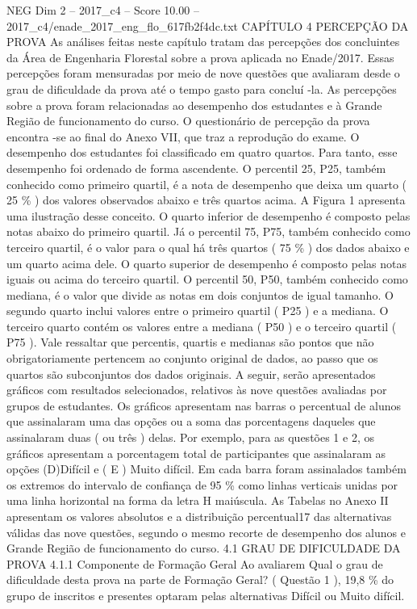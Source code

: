 \begin{textsample}{NEG Dim 2 – 2017\_c4 – Score 10.00 – 2017\_c4/enade\_2017\_eng\_flo\_617fb2f4dc.txt}  \label{ex:f2_neg_340}
CAPÍTULO 4 PERCEPÇÃO DA PROVA As análises feitas neste capítulo tratam das percepções dos concluintes da Área de Engenharia Florestal sobre a prova aplicada no Enade/2017.
Essas percepções foram mensuradas por meio de nove questões que avaliaram desde o grau de dificuldade da prova até o tempo gasto para concluí -la.
As percepções sobre a prova foram relacionadas ao desempenho dos estudantes e à Grande Região de funcionamento do curso.
O questionário de percepção da prova encontra -se ao final do Anexo VII, que traz a reprodução do exame.
O desempenho dos estudantes foi classificado em quatro quartos.
Para tanto, esse desempenho foi ordenado de forma ascendente.
O percentil 25, P25, também conhecido como primeiro quartil, é a nota de desempenho que deixa um quarto ( 25 \% ) dos valores observados abaixo e três quartos acima.
A Figura 1 apresenta uma ilustração desse conceito.
O quarto inferior de desempenho é composto pelas notas abaixo do primeiro quartil.
Já o percentil 75, P75, também conhecido como terceiro quartil, é o valor para o qual há três quartos ( 75 \% ) dos dados abaixo e um quarto acima dele.
O quarto superior de desempenho é composto pelas notas iguais ou acima do terceiro quartil.
O percentil 50, P50, também conhecido como mediana, é o valor que divide as notas em dois conjuntos de igual tamanho.
O segundo quarto inclui valores entre o primeiro quartil ( P25 ) e a mediana.
O terceiro quarto contém os valores entre a mediana ( P50 ) e o terceiro quartil ( P75 ).
Vale ressaltar que percentis, quartis e medianas são pontos que não obrigatoriamente pertencem ao conjunto original de dados, ao passo que os quartos são subconjuntos dos dados originais.
A seguir, serão apresentados gráficos com resultados selecionados, relativos às nove questões avaliadas por grupos de estudantes.
Os gráficos apresentam nas barras o percentual de alunos que assinalaram uma das opções ou a soma das porcentagens daqueles que assinalaram duas ( ou três ) delas.
Por exemplo, para as questões 1 e 2, os gráficos apresentam a porcentagem total de participantes que assinalaram as opções (D)Difícil e ( E ) Muito difícil.
Em cada barra foram assinalados também os extremos do intervalo de confiança de 95 \% como linhas verticais unidas por uma linha horizontal na forma da letra H maiúscula.
As Tabelas no Anexo II apresentam os valores absolutos e a distribuição percentual17 das alternativas válidas das nove questões, segundo o mesmo recorte de desempenho dos alunos e Grande Região de funcionamento do curso. 4.1 GRAU DE DIFICULDADE DA PROVA 4.1.1 Componente de Formação Geral Ao avaliarem Qual o grau de dificuldade desta prova na parte de Formação Geral? ( Questão 1 ), 19,8 \% do grupo de inscritos e presentes optaram pelas alternativas Difícil ou Muito difícil.

\end{textsample}
